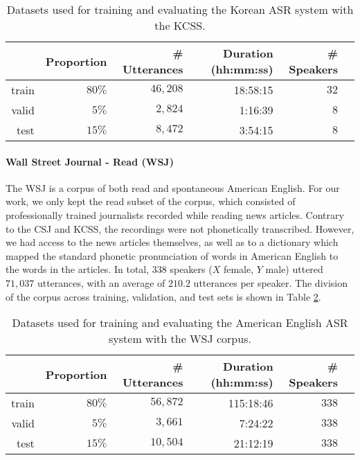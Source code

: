 \begin{table}[htb]
\centering
\caption{Datasets used for training and evaluating the Korean ASR system with the KCSS.}
\label{tab:hmm_kcss}
\vspace{0.25cm}
\begin{tabular}{rrrrrr}
  \toprule
      & Proportion & \# Utterances & Duration (hh:mm:ss) & \# Speakers &  \\ \midrule
  train & $80\%$ &  $46,208$ &   18:58:15   &   $32$    &  \\
  valid & $5\%$ &  $2,824$ &  1:16:39  &  $8$  &  \\
  test  & $15\%$ &  $8,472$ & 3:54:15   & $8$    & \\ \bottomrule
\end{tabular}
\end{table}

\paragraph{Wall Street Journal - Read (WSJ)}
The WSJ \cite{paul1992} is a corpus of both read and spontaneous American English.
For our work, we only kept the read subset of the corpus, which consisted of {\color{red}professionally trained journalists} recorded while reading news articles. Contrary to the CSJ and KCSS, the recordings were not phonetically transcribed. However, we had access to the news articles themselves, as well as to a dictionary which mapped the standard phonetic pronunciation of words in American English to the words in the articles.
In total, $338$ speakers {\color{red}($X$ female, $Y$ male)} uttered $71,037$ utterances, with an average of $210.2$ utterances per speaker. The division of the corpus across training, validation, and test sets is shown in Table \ref{tab:hmm_wsj}. 

\begin{table}[htb]
\centering
\caption{Datasets used for training and evaluating the American English ASR system with the WSJ corpus.}
\label{tab:hmm_wsj}
\vspace{0.25cm}
\begin{tabular}{rrrrrr}
  \toprule
      & Proportion & \# Utterances & Duration (hh:mm:ss) & \# Speakers &  \\ \midrule
  train & $80\%$ &  $56,872$ &   115:18:46   &   $338$    &  \\
  valid & $5\%$ &  $3,661$ &  7:24:22  &  $338$  &  \\
  test  & $15\%$ &  $10,504$ & 21:12:19  & $338$    & \\ \bottomrule
\end{tabular}
\end{table}
      
